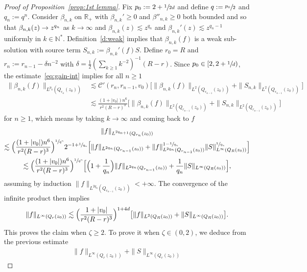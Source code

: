 \documentclass[10pt]{amsart}
\let\mathcal\mathscr
\theoremstyle{definition}
\theoremstyle{remark}
\newcommand\N{{\mathbb N}}
\newcommand\R{{\mathbb R}}
\newcommand{\cC}{\mathcal C}
\begin{document}
\begin{proof}[Proof of Proposition~\ref{prop:1st lemma}]
Fix $p_0:=2+\sfrac{1}{2d}$ and define $q:=\sfrac{p_0}{2}$ and
$q_n := q^n$. Consider $\beta_{n,k}$ on $\R_+$ with
$\beta_{n,k}' \ge 0$ and $\beta''_{n,k} \ge 0$ both bounded and
so that $\beta_{n,k}(z) \to\nobreak z^{q_n}$ as $k \to \infty$ and
$\beta_{n,k}(z) \lesssim z^{q_n}$ and
$\beta_{n,k}'(z) \lesssim z^{q_n-1}$ uniformly in $k \in
\N^*$. Definition~\ref{d:weak} implies that
$\beta_{n,k}(f)$ is a weak sub-solution with source term
$S_{n,k} := \beta_{n,k}'(f) S$. Define $r_0=R$ and
$r_n := r_{n-1} - \delta n^{-2}$ with
$\delta = \frac12( \sum_{k \ge 1} k^{-2}
)^{-1}(R-r)$. Since $p_0 \in [2,2+\sfrac1d)$, the
estimate~\eqref{eq:gain-int} implies for all $n \ge 1$
\begin{align*}
\|\beta_{n,k}(f)\|_{L^{p_0}(Q_{r_n}(z_0))}
& \lesssim
\cC'(r_n,r_{n-1},v_0) \bigl[
\|\beta_{n,k}(f)\|_{L^{2}(Q_{r_{n-1}}(z_0))}
+ \|S_{n,k}\|_{L^2(Q_{r_{n-1}}(z_0))} \bigr] \\
& \lesssim \frac{(1+|v_0|)n^6}{r^2(R-r)^3}
\bigl[ \|\beta_{n,k}(f)\|_{L^{2}(Q_{r_{n-1}}(z_0))}
+ \|S_{n,k}\|_{L^2(Q_{r_{n-1}}(z_0))} \bigr]
\end{align*}
for $n \ge 1$, which means by taking $k \to \infty$ and coming
back to $f$
\begin{multline*}
\|f\|_{L^{2q_{n+1}}(Q_{r_n}(z_0))} \\
\lesssim \Bigl(
\frac{(1+|v_0|)n^6}{r^2(R-r)^3} \Bigr)^{\sfrac{1}{q^n}}
2^{-1+\sfrac{1}{q_n}} \Bigl[
\|f\|_{L^{2q_n}(Q_{r_{n-1}}(z_0))} + \|
f\|_{L^{2q_n}(Q_{r_{n-1}}(z_0))}^{1-\sfrac{1}{q_n}}
\|S\|_{L^\infty(Q_R(z_0))}^{\sfrac{1}{q_n}} \Bigr] \\
\lesssim \Bigl(
\frac{(1+|v_0|)n^6}{r^2(R-r)^3} \Bigr)^{\sfrac{1}{q^n}}
\Bigl[ \Bigl( 1 + \frac{1}{q_n} \Bigr)
\|f\|_{L^{2q_n}(Q_{r_{n-1}}(z_0))} + \frac{1}{q_n}
\|S\|_{L^\infty(Q_R(z_0))} \Bigr],
\end{multline*}
assuming by induction
$\|f\|_{L^{2q_n}(Q_{r_{n-1}}(z_0))} < +\infty$. The convergence
of the infinite product then implies
\begin{equation*}
\|f\|_{L^\infty(Q_r(z_0))}
\lesssim \Bigl( \frac{1+|v_0|}{r^2(R-r)^3}
\Bigr)^{1+4d} \bigl[ \|f\|_{L^2(Q_R(z_0))} +
\|S\|_{L^\infty(Q_R(z_0))} \bigr].
\end{equation*}
This proves the claim when $\zeta \ge 2$. To prove it when
$\zeta \in (0,2)$, we deduce from the previous estimate
\begin{multline*}
\|f\|_{L^\infty(Q_r(z_0))} + \|S\|_{L^\infty(Q_r(z_0))}

\end{multline*}
\end{proof}
\end{document}
